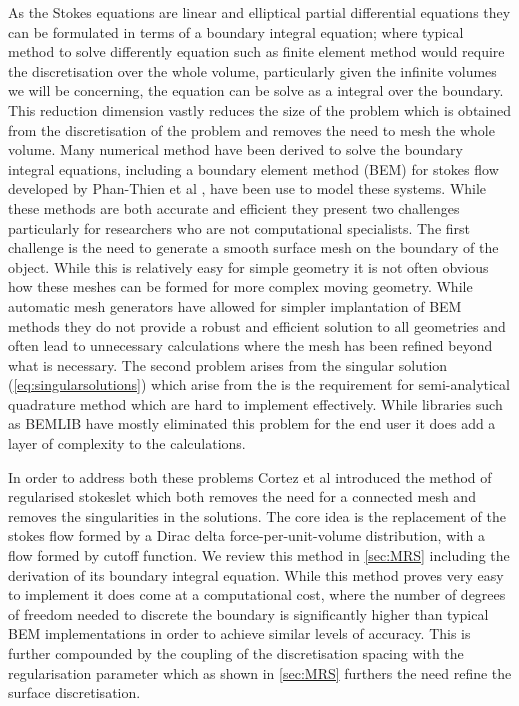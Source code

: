 As the Stokes equations are linear and elliptical partial differential equations they can be formulated in terms of a boundary integral equation; where typical method to solve differently equation such as finite element method would require the discretisation over the whole volume, particularly given the infinite volumes we will be concerning, the equation can be solve as a integral over the boundary. This reduction dimension vastly reduces the size of the problem which is obtained from the discretisation of the problem and removes the need to mesh the whole volume. Many numerical method have been derived to solve the boundary integral equations, including a boundary element method (BEM) for stokes flow developed by Phan-Thien et al \cite{Tran-Cong1987APropulsion}, have been use to model these systems. While these methods are both accurate and efficient they present two challenges particularly for researchers who are not computational specialists. The first challenge is the need to generate a smooth surface mesh on the boundary of the object. While this is relatively easy for simple geometry it is not often obvious how these meshes can be formed for more complex moving geometry. While automatic mesh generators have allowed for simpler implantation of BEM methods they do not provide a robust and efficient solution to all geometries and often lead to unnecessary calculations where the mesh has been refined  beyond what is necessary. The second problem arises from the singular solution (\cref{eq:singularsolutions}) which arise from the is the requirement for semi-analytical quadrature method which are hard to implement effectively. While libraries such as BEMLIB \cite{BEMLIB} have mostly eliminated this problem for the end user it does add a layer of complexity to the calculations.

In order to address both these problems Cortez et al \cite{Cortez2001,Cortez2005} introduced the method of regularised stokeslet which both removes the need for a connected mesh and removes the singularities in the solutions. The core idea is the replacement of the stokes flow formed by a Dirac delta force-per-unit-volume distribution, with a flow formed by cutoff function. We review this method in \cref{sec:MRS} including the derivation of its boundary integral equation. While this method proves very easy to implement it does come at a computational cost, where the number of degrees of freedom needed to discrete the boundary is significantly higher than typical BEM implementations in order to achieve similar levels of accuracy. This is further compounded by the coupling of the discretisation spacing with the regularisation parameter which as shown in \cref{sec:MRS} furthers the need refine the surface discretisation. 

